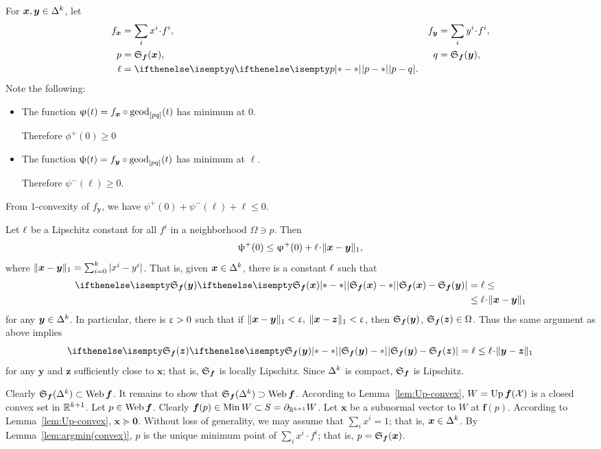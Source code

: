 For $\bm{x},\bm{y}\in\Delta^\kay$,
let 
\begin{align*}
f_{\bm{x}}
&=\sum_i x^i\cdot f^i,
&
f_{\bm{y}}
&=\sum_i y^i\cdot f^i,
\\
p
&=\spx{\bm{f}}(\bm{x}),
&
q
&=\spx{\bm{f}}(\bm{y}),
\\
\ell&=\dist{p}{q}{}.
\end{align*}
Note the following:
\begin{itemize}
\item The function $\phi(t)=f_{\bm{x}}\circ\geod_{[p q]}(t)$ has minimum at $0$. 

Therefore $\phi^+(0)\ge 0$
\item The function $\psi(t)=f_{\bm{y}}\circ\geod_{[p q]}(t)$ has minimum at $\ell$. 

Therefore $\psi^-(\ell)\ge 0$.
\end{itemize}
From $1$-convexity of $f_{\bm{y}}$, we have
$\psi^+(0)+\psi^-(\ell)+\ell\le0$.

Let ${\ell}$ be a Lipschitz constant for all $f^i$ in a neighborhood $\Omega\ni p$.
Then 
\[\psi^+(0)
\le 
\phi^+(0)+\Lip\cdot\|\bm{x}-\bm{y}\|_1,\] 
where $\|\bm{x}-\bm{y}\|_1=\sum_{i=0}^k|x^i-y^i|$.
That is, given $\bm{x}\in\Delta^\kay$, there is a constant ${\ell}$ such that
\begin{align*}
\dist{\spx{\bm{f}}(\bm{x})}{\spx{\bm{f}}(\bm{y})}{}
&=
\ell
\le
\\
&\le 
\Lip\cdot\|\bm{x}-\bm{y}\|_1
\end{align*}
for any $\bm{y}\in\Delta^\kay$.
In particular, there is $\upvarepsilon>0$ such that if $\|\bm{x}-\bm{y}\|_1<\upvarepsilon,$ $\|\bm{x}-\bm{z}\|_1 <\upvarepsilon$, then $\mathfrak{S}_{\bm{f}}(\bm{y})$, $\spx{\bm{f}}(\bm{z})\in\Omega$. 
Thus the same argument as above implies 
\[\dist{\spx{\bm{f}}(\bm{y})}{\spx{\bm{f}}(\bm{z})}{}
=
\ell\le \Lip\cdot\|\bm{y}-\bm{z}\|_1\]
for any $\bm{y}$ and $\bm{z}$ sufficiently close to $\bm{x}$; that is, $\mathfrak{S}_{\bm{f}}$ is locally Lipschitz.
Since $\Delta^k$ is compact, $\mathfrak{S}_{\bm{f}}$ is Lipschitz.

Clearly $\spx{\bm{f}}(\Delta^\kay)\subset \Web \bm{f}$.
It remains to show that $\spx{\bm{f}}(\Delta^\kay)\supset \Web \bm{f}$.
According to Lemma~\ref{lem:Up-convex},
$W=\mathop{\rm Up}\nolimits\bm{f}(\mathcal{X})$ is a closed convex set in $\mathbb{R}^{k+1}$.
Let $p\in \Web \bm{f}$. 
Clearly $\bm{f}(p)\in \Min W\subset S\z=\Fr_{\RR^{\kay+1}}W$.
Let $\bm{x}$ be a subnormal vector to $W$ at $\bm{f}(p)$.
According to Lemma~\ref{lem:Up-convex}, 
$\bm{x} \succcurlyeq\bm{0}$.
Without loss of generality, we may assume that $\sum_i x^i=1$;
that is, $\bm{x}\in \Delta^\kay$.
By Lemma~\ref{lem:argmin(convex)},
$p$ is the unique minimum point of $\sum_i x^i\cdot f^i$;
that is, $p=\mathfrak{S}_{\bm{f}}(\bm{x})$.
\qeds








